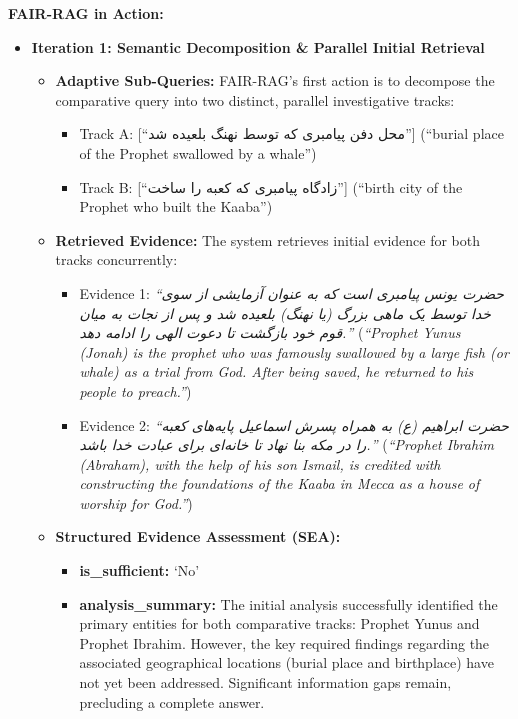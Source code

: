 \documentclass[11pt]{article}
\newcommand{\fa}[1]{\textfarsi{#1}}
\begin{document}
\textbf{FAIR-RAG in Action:}

\begin{itemize}
\item \textbf{Iteration 1: Semantic Decomposition \& Parallel Initial Retrieval}
  \begin{itemize}
  \item \textbf{Adaptive Sub-Queries:} FAIR-RAG's first action is to decompose the comparative query into two distinct, parallel investigative tracks:
    \begin{itemize}
  \item Track A: [``\fa{محل دفن پیامبری که توسط نهنگ بلعیده شد}''] (``burial place of the Prophet swallowed by a whale'')
  \item Track B: [``\fa{زادگاه پیامبری که کعبه را ساخت}''] (``birth city of the Prophet who built the Kaaba'')
    \end{itemize}
  \item \textbf{Retrieved Evidence:} The system retrieves initial evidence for both tracks concurrently:
    \begin{itemize}
  \item Evidence 1: \emph{``\fa{حضرت یونس پیامبری است که به عنوان آزمایشی از سوی خدا توسط یک ماهی بزرگ (یا نهنگ) بلعیده شد و پس از نجات به میان قوم خود بازگشت تا دعوت الهی را ادامه دهد.}''} (\emph{``Prophet Yunus (Jonah) is the prophet who was famously swallowed by a large fish (or whale) as a trial from God. After being saved, he returned to his people to preach.''})
  \item Evidence 2: \emph{``\fa{حضرت ابراهیم (ع) به همراه پسرش اسماعیل پایه‌های کعبه را در مکه بنا نهاد تا خانه‌ای برای عبادت خدا باشد.}''} (\emph{``Prophet Ibrahim (Abraham), with the help of his son Ismail, is credited with constructing the foundations of the Kaaba in Mecca as a house of worship for God.''})
    \end{itemize}
  \item \textbf{Structured Evidence Assessment (SEA):}
    \begin{itemize}
    \item \textbf{is\_sufficient:} `No'
    \item \textbf{analysis\_summary:} The initial analysis successfully identified the primary entities for both comparative tracks: Prophet Yunus and Prophet Ibrahim. However, the key required findings regarding the associated geographical locations (burial place and birthplace) have not yet been addressed. Significant information gaps remain, precluding a complete answer.
    \end{itemize}
  \end{itemize}


\end{itemize}
\end{document}
